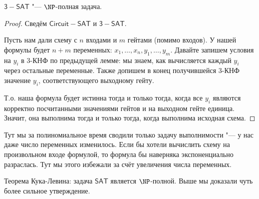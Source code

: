 	\begin{theorem}
		$\mathsf{3-SAT}$ "--- $\NP$-полная задача.
	\end{theorem}
	\begin{proof}
		Сведём $\mathsf{Circuit-SAT}$ и $\mathsf{3-SAT}$.

		Пусть нам дали схему с $n$ входами и $m$ гейтами (помимо входов).
		У нашей формулы будет $n+m$ переменных: $x_1, \dots, x_n, y_1, \dots, y_m$.
		Давайте запишем условия на $y_i$ в 3-КНФ по предыдущей лемме: мы знаем, как вычисляется каждый $y_i$ через остальные переменные.
		Также допишем в конец получившейся 3-КНФ значение $y_i$, соответствующего выходному гейту.

		Т.о. наша формула будет истинна тогда и только тогда, когда все $y_i$ являются корректно посчитанными значениями гейтов и на выходном гейте единица.
		Значит, она выполнима тогда и только тогда, когда выполнима исходная схема.
	\end{proof}
	\begin{Rem}
		Тут мы за полиномиальное время сводили только задачу выполнимости "--- у нас даже число переменных изменилось.
		Если бы хотели вычислить схему на произвольном входе формулой, то формула бы наверняка экспоненциально разраслась.
		Тут мы этого избежали за счёт увеличения числа переменных.
	\end{Rem}

	\begin{Rem}
		Теорема Кука-Левина: задача $\mathsf{SAT}$ является $\NP$-полной.
		Выше мы доказали чуть более сильное утверждение.
	\end{Rem}
